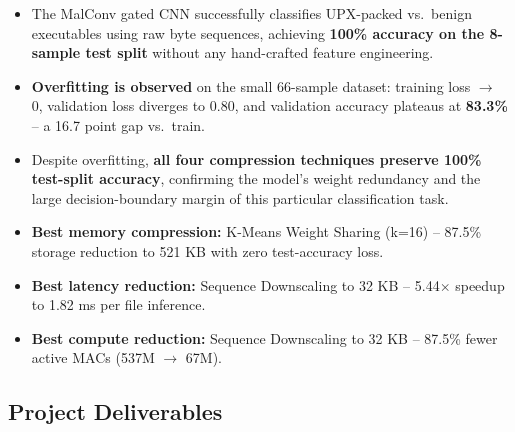 \documentclass[12pt,a4paper]{article}
\begin{document}
\begin{tcolorbox}[resultbox]
\begin{itemize}
  \item The MalConv gated CNN successfully classifies UPX-packed vs.\ benign
        executables using raw byte sequences, achieving \textbf{100\% accuracy
        on the 8-sample test split} without any hand-crafted feature engineering.
  \item \textbf{Overfitting is observed} on the small 66-sample dataset: training
        loss $\rightarrow$ 0, validation loss diverges to 0.80, and validation
        accuracy plateaus at \textbf{83.3\%} -- a 16.7 point gap vs.\ train.
  \item Despite overfitting, \textbf{all four compression techniques preserve
        100\% test-split accuracy}, confirming the model's weight redundancy and
        the large decision-boundary margin of this particular classification task.
  \item \textbf{Best memory compression:} K-Means Weight Sharing (k=16) --
        87.5\% storage reduction to 521 KB with zero test-accuracy loss.
  \item \textbf{Best latency reduction:} Sequence Downscaling to 32 KB --
        5.44$\times$ speedup to 1.82 ms per file inference.
  \item \textbf{Best compute reduction:} Sequence Downscaling to 32 KB --
        87.5\% fewer active MACs (537M $\rightarrow$ 67M).
\end{itemize}
\end{tcolorbox}

\subsection{Project Deliverables}
\end{document}
